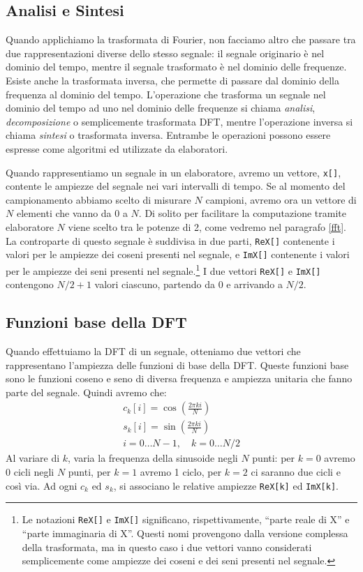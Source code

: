 \subsection{Analisi e Sintesi}
Quando applichiamo la trasformata di Fourier, non facciamo altro che passare tra
due rappresentazioni diverse dello stesso segnale: il segnale originario \`e nel
dominio del tempo, mentre il segnale trasformato \`e nel dominio delle
frequenze. Esiste anche la trasformata inversa, che permette di passare dal
dominio della frequenza al dominio del tempo.
L'operazione che trasforma un segnale nel dominio del tempo ad uno nel dominio
delle frequenze si chiama \emph{analisi}, \emph{decomposizione} o semplicemente
{trasformata DFT}, mentre l'operazione inversa si chiama \emph{sintesi} o
{trasformata inversa}. Entrambe le operazioni possono essere espresse come
algoritmi ed utilizzate da elaboratori.

Quando rappresentiamo un segnale in un elaboratore, avremo un vettore,
\texttt{x[]}, contente le ampiezze del segnale nei vari intervalli di tempo. Se
al momento del campionamento abbiamo scelto di misurare $N$ campioni, avremo ora
un vettore di $N$ elementi che vanno da 0 a $N$. Di solito per facilitare la
computazione tramite elaboratore $N$ viene scelto tra le potenze di 2, come
vedremo nel paragrafo \ref{fft}. La controparte di questo segnale \`e suddivisa
in due parti, \texttt{ReX[]} contenente i valori per le ampiezze dei coseni
presenti nel segnale, e \texttt{ImX[]} contenente i valori per le ampiezze dei
seni presenti nel segnale.\footnote{Le notazioni \texttt{ReX[]} e
\texttt{ImX[]} significano, rispettivamente, ``parte reale di X'' e ``parte
immaginaria di X''. Questi nomi provengono dalla versione complessa della
trasformata, ma in questo caso i due vettori vanno considerati semplicemente
come ampiezze dei coseni e dei seni presenti nel segnale.} I due vettori
\texttt{ReX[]} e \texttt{ImX[]} contengono $N/2 + 1$ valori ciascuno, partendo
da 0 e arrivando a $N/2$.

\subsection{Funzioni base della DFT}
Quando effettuiamo la DFT di un segnale, otteniamo due vettori che rappresentano
l'ampiezza delle funzioni di base della DFT. Queste funzioni base sono le
funzioni coseno e seno di diversa frequenza e ampiezza unitaria che fanno parte
del segnale. Quindi avremo che:
\[
\begin{array}{c}
c_k[i] = \cos\left(\frac{2\pi ki}{N}\right)\\[0.5em]
s_k[i] = \sin\left(\frac{2\pi ki}{N}\right)\\[0.5em]
i = 0\dots N-1, \quad k = 0 \dots N/2
\end{array}
\]
Al variare di $k$, varia la frequenza della sinusoide negli $N$ punti: per $k =
0$ avremo $0$ cicli negli $N$ punti, per $k=1$ avremo 1 ciclo, per $k=2$ ci
saranno due cicli e cos\`i via. Ad ogni $c_k$ ed $s_k$, si associano le relative
ampiezze \texttt{ReX[k]} ed \texttt{ImX[k]}.


